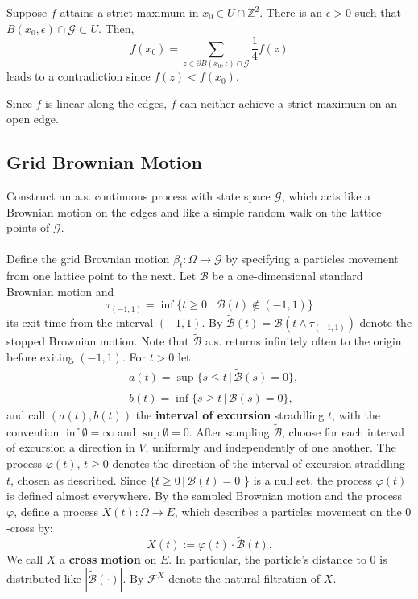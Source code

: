 \documentclass[11pt]{article}
\makeatletter
\renewenvironment{proof}[1][\proofname]{
   \par\pushQED{\qed}\normalfont
   \topsep6\p@\@plus6\p@\relax
   \trivlist\item[\hskip\labelsep\bfseries#1\@addpunct{.}]
   \ignorespaces
}{
   \popQED\endtrivlist\@endpefalse
}
\numberwithin{equation}{section}
\def\mydot{\boldsymbol{\cdot}}
\makeatother
\begin{document}
\begin{proof}
  Suppose $f$ attains a strict maximum
  in $x_0 \in U \cap \mathbb{Z}^2$. 
  There is an $\epsilon > 0$ such that 
  $\bar{B}(x_0, \epsilon) \cap \mathcal{G} \subset U$. Then, 
  \begin{equation}\nonumber
    f(x_0) = \sum_{z \in \partial B(x_0, \epsilon) \cap \mathcal{G}} 
      \frac{1}{4} f(z) 
  \end{equation}
  leads to a contradiction since $f(z) < f(x_0)$. 

  Since $f$ is linear along the edges, $f$ can neither
  achieve a strict maximum on an open edge. 
\end{proof}


\subsection{Grid Brownian Motion} \label{sec: grid BM}
Construct an a.s. continuous process with state space $\mathcal{G}$, 
which acts like a Brownian motion on the edges and like a simple random 
walk on the lattice points of $\mathcal{G}$. \\~\\
Define the grid Brownian motion 
    $\beta_t : \Omega \rightarrow \mathcal{G}$
by specifying a particles movement from one lattice
point to the next. 
Let $\mathcal{B}$
be a one-dimensional standard Brownian motion and 
$$
\tau_{(-1,1)} = 
  \inf \{ t \geq 0\ \,|\, \mathcal{B}(t) \notin (-1,1) \}
$$ 
its exit time from the interval $(-1,1)$.
By $\tilde{\mathcal{B}}(t) = \mathcal{B}(t \land \tau_{(-1,1)})$ 
denote the stopped Brownian motion.
Note that $\tilde{\mathcal{B}}$
a.s. returns infinitely often to the origin before exiting $(-1,1)$. 
For $t>0$ let
\begin{equation}
  \begin{split}
    & a(t) = \sup 
      \{ s \leq t \,|\, \tilde{\mathcal{B}}(s) = 0\},\\
    & b(t) = \inf 
      \{ s \geq t \,|\, \tilde{\mathcal{B}}(s) = 0\}, \nonumber
\end{split}
\end{equation}
and call $(a(t), b(t))$ the \textbf{interval of excursion} straddling $t$, 
with the convention $\inf \emptyset = \infty$ and $\sup \emptyset = 0$.
After sampling $\tilde{\mathcal{B}}$,
choose for each interval of excursion a direction 
in $V$, uniformly and independently of one another.
The process $\varphi(t)$, $t\geq 0$  denotes the 
direction of the interval of 
excursion straddling $t$, chosen as described.
Since $\{ t \geq 0 \,|\, \tilde{\mathcal{B}}(t) = 0$ \} is a null set,
the process $\varphi(t)$ is defined almost everywhere.
By the sampled Brownian motion and the process $\varphi$,
define a process $X(t) : \Omega \rightarrow \bar{E}$,
which describes a particles movement on the $0$-cross by:
\begin{equation}
  \label{D: cross motion X}
  \nonumber
  X(t) := \varphi(t) \cdot \tilde{\mathcal{B}}(t).
\end{equation}
We call $X$ a \textbf{cross motion} on $E$.
In particular, the particle's distance to $0$ is distributed 
like $|\tilde{\mathcal{B}}(\mydot)|$.
By $\mathcal{F}^X$ denote the natural filtration of $X$.
\end{document}
